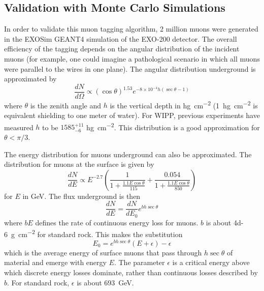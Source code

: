 \documentclass[herrin-thesis.tex]{subfiles}
\begin{document}
\subsection{Validation with Monte Carlo Simulations}
In order to validate this muon tagging algorithm, 2 million muons were generated in the EXOSim GEANT4 simulation of the EXO-200 detector. The overall efficiency of the tagging depends on the angular distribution of the incident muons (for example, one could imagine a pathological scenario in which all muons were parallel to the wires in one plane). The angular distribution underground is approximated\cite{miyake:1973} by
\begin{equation}
\label{eq:muon_angular_distribution}
\frac{dN}{d\Omega} \propto \left (\cos \theta \right)^{1.53}e^{-8\times10^{-4} h \left(\sec \theta -1\right)}
\end{equation}
where \(\theta\) is the zenith angle and \(h\) is the vertical depth in \si{\hecto\gram\per\square\centi\meter} (\SI{1}{\hecto\gram\per\square\centi\meter} is equivalent shielding to one meter of water). For WIPP, previous experiments have measured \(h\) to be \(1585^{+11}_{-6}\) \si{\hecto\gram\per\square\centi\meter}\cite{Esch:2004zj}. This distribution is a good approximation for \(\theta < \pi/3\).

The energy distribution for muons underground can also be approximated\cite{Gaisser:1990kx}. The distribution for muons at the surface is given by
\begin{equation}
\label{eq:muon_surface_distribution}
\frac{dN}{dE} \propto E^{-2.7}\left(\frac{1}{1+\frac{1.1 E \cos \theta}{115}} + \frac{0.054}{1+\frac{1.1 E \cos \theta}{850}}\right)
\end{equation}
for \(E\) in \si{\GeV}. The flux underground is then
\begin{equation}
\label{eq:muon_underground_distribution}
\frac{dN}{dE} = \frac{dN}{dE_0}e^{b h \sec \theta}
\end{equation}
where \(b E\) defines the rate of continuous energy loss for muons. \(b\) is about \SI{4d-6}{\g\per\square\cm} for standard rock. This makes the substitution
\begin{equation}
\label{eq:muon_E0_def}
E_0 = e^{b h \sec \theta}\left(E + \epsilon\right) - \epsilon
\end{equation}
which is the average energy of surface muons that pass through \(h\sec\theta\) of material and emerge with energy \(E\). The parameter \(\epsilon\) is a critical energy above which discrete energy losses dominate, rather than continuous losses described by \(b\). For standard rock, \(\epsilon\) is about \SI{693}{\GeV}\cite{groom:2001ys}.
\end{document}
